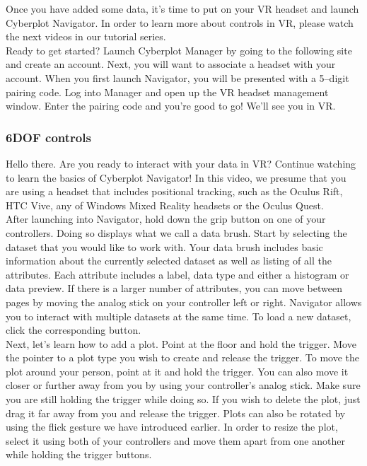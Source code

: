 \documentclass{article}
\begin{document}
Once you have added some data, it's time to put on your VR headset and launch Cyberplot Navigator. In order to learn more about controls in VR, please watch the next videos in our tutorial series.\\

Ready to get started? Launch Cyberplot Manager by going to the following site and create an account. Next, you will want to associate a headset with your account. When you first launch Navigator, you will be presented with a 5--digit pairing code. Log into Manager and open up the VR headset management window. Enter the pairing code and you're good to go! We'll see you in VR.

\newpage

\subsubsection{6DOF controls}

Hello there. Are you ready to interact with your data in VR? Continue watching to learn the basics of Cyberplot Navigator! In this video, we presume that you are using a headset that includes positional tracking, such as the Oculus Rift, HTC Vive, any of Windows Mixed Reality headsets or the Oculus Quest.\\

After launching into Navigator, hold down the grip button on one of your controllers. Doing so displays what we call a data brush. Start by selecting the dataset that you would like to work with. Your data brush includes basic information about the currently selected dataset as well as listing of all the attributes. Each attribute includes a label, data type and either a histogram or data preview. If there is a larger number of attributes, you can move between pages by moving the analog stick on your controller left or right. Navigator allows you to interact with multiple datasets at the same time. To load a new dataset, click the corresponding button.\\ 

Next, let's learn how to add a plot. Point at the floor and hold the trigger. Move the pointer to a plot type you wish to create and release the trigger. To move the plot around your person, point at it and hold the trigger. You can also move it closer or further away from you by using your controller's analog stick. Make sure you are still holding the trigger while doing so. If you wish to delete the plot, just drag it far away from you and release the trigger. Plots can also be rotated by using the flick gesture we have introduced earlier. In order to resize the plot, select it using both of your controllers and move them apart from one another while holding the trigger buttons.
\end{document}
